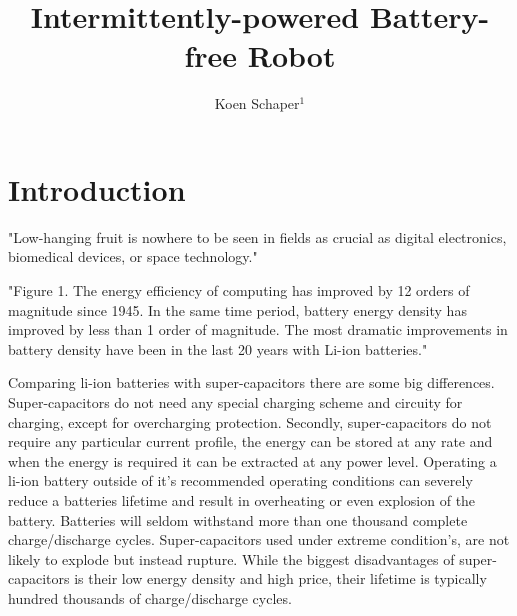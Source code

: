 \documentclass[letterpaper, 10 pt, conference]{ieeeconf}  %
\title{\LARGE \bf
Intermittently-powered Battery-free Robot
}
\author{Koen Schaper$^{1}$ %
}
\begin{document}
\maketitle
\thispagestyle{empty}
\pagestyle{empty}






\section{Introduction}


"Low-hanging fruit is nowhere to be seen in fields as crucial as digital electronics, biomedical devices, or space technology."
\cite{zachary_spec_2016}

"Figure 1. The energy efficiency of computing has improved by 12 orders of magnitude since 1945. In the same time period, battery energy density has improved by less than 1 order of magnitude. The most dramatic improvements in battery density have been in the last 20 years with Li-ion batteries."
\cite{patel_pvc_2017}

Comparing li-ion batteries with super-capacitors there are some big differences.
Super-capacitors do not need any special charging scheme and circuity for charging, except for overcharging protection.
Secondly, super-capacitors do not require any particular current profile, the energy can be stored at any rate and when the energy is required it can be extracted at any power level.
Operating a li-ion battery outside of it's recommended operating conditions can severely reduce a batteries lifetime and result in overheating or even explosion of the battery.
Batteries will seldom withstand more than one thousand complete charge/discharge cycles.
Super-capacitors used under extreme condition's, are not likely to explode but instead rupture.
While the biggest disadvantages of super-capacitors is their low energy density and high price, their lifetime is typically hundred thousands of charge/discharge cycles.
\end{document}
